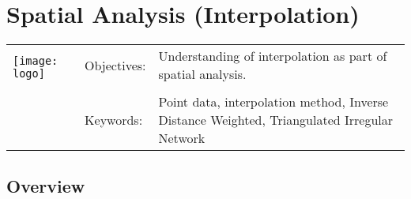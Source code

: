 

\section{Spatial Analysis (Interpolation)}\label{sec:interpolation}
\begin{tabular}{p{3.5cm}p{6cm}p{6cm}}
\multirow{2}{*}{\texttt{[image: logo]}} & Objectives: &
Understanding of interpolation as part of spatial analysis. \\
& & \\
& Keywords: & 
Point data, interpolation method, Inverse Distance Weighted, Triangulated
Irregular Network  \\
\hline
\end{tabular}

\subsection{Overview}\label{subsec:overview}



